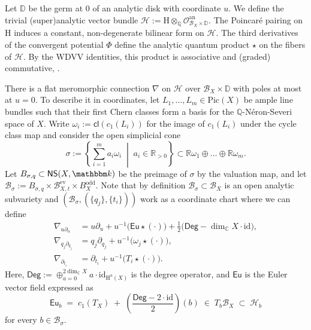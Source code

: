 \documentclass[12pt,a4paper]{amsart}
\theoremstyle{definition}
\theoremstyle{remark}
\newcommand{\Q}{\mathbb{Q}}
\newcommand{\C}{\mathbb{C}}
\newcommand{\rH}{\mathrm{H}}
\begin{document}
Let $\mathbb D$ be the germ at $0$ of an analytic disk with coordinate $u$. We define the trivial (super)analytic vector bundle $\mathcal H := \mathrm{H}\otimes_{\Q}\mathcal O^{\mathrm{an}}_{\mathcal B_X\times\mathbb D}$. The Poincar\'e pairing on $\mathrm{H}$ induces a constant, non-degenerate bilinear form on $\mathcal H$. The third derivatives of the convergent potential $\Phi$ define the analytic quantum product $\star$ on the fibers of $\mathcal H$. By the WDVV identities, this product is associative and (graded) commutative, \cite{Kontsevich1994}.

There is a flat meromorphic connection $\nabla$ on $\mathcal H$ over $\mathcal B_X\times\mathbb D$ with poles at most at $u=0$. To describe it in coordinates, let $L_1, \dots, L_m \in \mathrm{Pic}(X)$ be ample line bundles such that their first Chern classes form a basis for the $\mathbb Q$-N\'eron-Severi space of $X$. Write $\omega_i := \mathsf{cl}(c_1(L_i))$ for the image of $c_1(L_i)$ under the cycle class map and consider the open simplicial cone
$$
\sigma := \left\{ \sum_{i=1}^m a_i \omega_i \;\middle|\; a_i \in \mathbb{R}_{>0} \right\} \subset \mathbb{R}\omega_1 \oplus \dots \oplus \mathbb{R}\omega_m.
$$
Let $B_{\sigma,q} \subset \mathsf{NS}(X, \mathbbm k)$ be the preimage of $\sigma$ by the valuation map, and let $\mathcal B_{\sigma} := B_{\sigma,q} \times \mathcal B^\mathrm{ev}_{X,t} \times  B^\mathrm{odd}_{X}$.
Note that by definition $\mathcal B_{\sigma} \subset \mathcal B_X$ is an open analytic subvariety and $(\mathcal B_{\sigma},(\{q_j\},\{t_i\}))$ work as a coordinate chart where we can define
\begin{align}
\nabla_{u\partial_u} &= u\partial_u + u^{-1}\big(\mathsf{Eu}\star(\cdot)\big) + \tfrac12\big(\mathsf{Deg}-\dim_{\mathbb C} X\cdot\mathrm{id}\big),\\
\nabla_{q_j\partial_{q_j}} &= q_j\partial_{q_j} + u^{-1}\big(\omega_j\star(\cdot)\big),\\
\nabla_{\partial_{t_i}} &= \partial_{t_i} + u^{-1}\big(T_i\star(\cdot)\big).
\end{align}
Here, $\mathsf{Deg}:=\oplus_{a=0}^{2\dim_{\C}X}a\cdot \mathrm{id}_{\rH^a(X)}$ is the degree operator, and $\mathsf{Eu}$ is the Euler vector field expressed as 
\begin{equation}\label{eq:Euler}
\mathsf{Eu}_b \;=\; c_1(T_X) \;+\; \left(\frac{\mathsf{Deg} - 2\cdot\mathrm{id}}{2}\right)(b)
\;\in\; T_b\mathcal B_X \;\subset\; \mathcal H_b
\end{equation}
for every $b\in \mathcal B_{\sigma}$.
\end{document}
